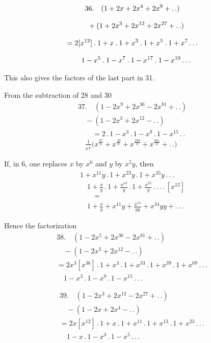 \[
\begin{gathered}
36.\quad (1+2x+2x^{4}+2x^{9}+\mathinner{.\,.})\\[8pt]\quad{}+(1+2x^{3}+2x^{12}+2x^{27}+\mathinner{.\,.})\\[8pt]
 =2[x^{12}]\mathbin{.}1+x\mathbin{.}1+x^{3}\mathbin{.}1+x^{5}\mathbin{.}1+x^{7}\mathinner{.\,.\,.}\\[8pt]\quad{}
 1-x^{5}\mathbin{.}1-x^{7}\mathbin{.}1-x^{17}\mathbin{.}1-x^{19}\mathinner{.\,.\,.}
\end{gathered}
\]


This also gives the factors of the last part in 31.


From the subtraction of 28 and 30
\[
\begin{gathered}
37.\quad (1-2x^9+2x^{36}-2x^{81}+ .\,.)\\[8pt]\quad{}-(1-2x^3+2x^{12}- .\,.)\\[8pt]
\qquad=2\,.\,1-x^3\,.\,1-x^9\,.\,1-x^{15}\,.\,.\,
\\[8pt]\quad{}\frac{1}{x^{\frac18}}\bigl(x^{\frac{25}{8}}+x^{\frac{49}{8}}+x^{\frac{289}{8}}+x^{\frac{361}{8}}+ .\,.\bigr)
\end{gathered}
\]

If, in 6, one replaces $x$ by $x^6$ and $y$ by $x^5y$, then
\[
\begin{gathered}
1+x^{11}y\,.\,1+x^{23}y\,.\,1+x^{35}y\,.\,.\,.\,
\\[8pt]\quad{}1+\frac{x}{y}\,.\,1+\frac{x^{13}}{y}\,.\,1+\frac{x^{25}}{y}\,.\,.\,.\,.\,[x^{12}]\\[8pt]
\qquad=\\[8pt]\quad{}1+\frac{x}{y}+x^{11}y+\frac{x^{14}}{yy}+x^{34}yy+ .\,.\,.
\end{gathered}
\]

Hence the factorization
\[
\begin{gathered}
38.\quad (1-2x^5+2x^{36}-2x^{81}+ .\,.)\\[8pt]\quad{}-(1-2x^3+2x^{12}- .\,.)\\[8pt]
=2x^3[x^{36}]\,.\,1+x^3\,.\,1+x^{33}\,.\,1+x^{39}\,.\,1+x^{69}\,.\,.\,.\,\\[8pt]\quad{}
1-x^3\,.\,1-x^9\,.\,1-x^{15}\,.\,.\,.
\end{gathered}
\]

\[
\begin{gathered}
39.\quad (1-2x^3+2x^{12}-2x^{27}+ .\,.)\\[8pt]\quad{}-(1-2x+2x^4- .\,.)\\[8pt]
=2x[x^{12}]\,.\,1+x\,.\,1+x^{11}\,.\,1+x^{13}\,.\,1+x^{23}\,.\,.\,.\,\\[8pt]\quad{}
1-x\,.\,1-x^3\,.\,1-x^5\,.\,.\,.
\end{gathered}
\]

